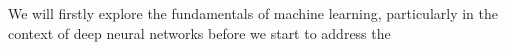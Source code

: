 We will firstly explore the fundamentals of machine learning, particularly in the context of deep neural networks before we start to address the 